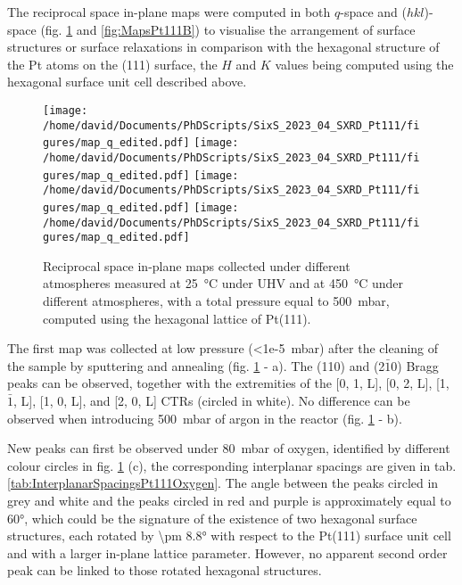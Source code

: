 The reciprocal space in-plane maps were computed in both $q$-space and ($hkl$)-space (fig. \ref{fig:MapsPt111A} and \ref{fig:MapsPt111B}) to visualise the arrangement of surface structures or surface relaxations in comparison with the hexagonal structure of the Pt atoms on the (111) surface, the $H$ and $K$ values being computed using the hexagonal surface unit cell described above.

\begin{figure}[!htb]
    \centering
    \texttt{[image: /home/david/Documents/PhDScripts/SixS\_2023\_04\_SXRD\_Pt111/figures/map\_q\_edited.pdf]}
    \texttt{[image: /home/david/Documents/PhDScripts/SixS\_2023\_04\_SXRD\_Pt111/figures/map\_q\_edited.pdf]}
    \texttt{[image: /home/david/Documents/PhDScripts/SixS\_2023\_04\_SXRD\_Pt111/figures/map\_q\_edited.pdf]}
    \texttt{[image: /home/david/Documents/PhDScripts/SixS\_2023\_04\_SXRD\_Pt111/figures/map\_q\_edited.pdf]}
    \caption{
        Reciprocal space in-plane maps collected under different atmospheres measured at \qty{25}{\degreeCelsius} under UHV and at \qty{450}{\degreeCelsius} under different atmospheres, with a total pressure equal to \qty{500}{\milli\bar}, computed using the hexagonal lattice of Pt(111).
    }
    \label{fig:MapsPt111A}
\end{figure}

The first map was collected at low pressure (\qty{<1e-5}{\milli\bar}) after the cleaning of the sample by sputtering and annealing (fig. \ref{fig:MapsPt111A} - a).
The (110) and (2$\bar{1}$0) Bragg peaks can be observed, together with the extremities of the [0, 1, L], [0, 2, L], [1, $\bar{1}$, L], [1, 0, L], and [2, 0, L] CTRs (circled in white).
No difference can be observed when introducing \qty{500}{\milli\bar} of argon in the reactor (fig. \ref{fig:MapsPt111A} - b).

New peaks can first be observed under \qty{80}{\milli\bar} of oxygen, identified by different colour circles in fig. \ref{fig:MapsPt111A} (c), the corresponding interplanar spacings are given in tab. \ref{tab:InterplanarSpacingsPt111Oxygen}.
The angle between the peaks circled in grey and white and the peaks circled in red and purple is approximately equal to \ang{60}, which could be the signature of the existence of two hexagonal surface structures, each rotated by \ang{\pm 8.8} with respect to the Pt(111) surface unit cell and with a larger in-plane lattice parameter.
However, no apparent second order peak can be linked to those rotated hexagonal structures.

